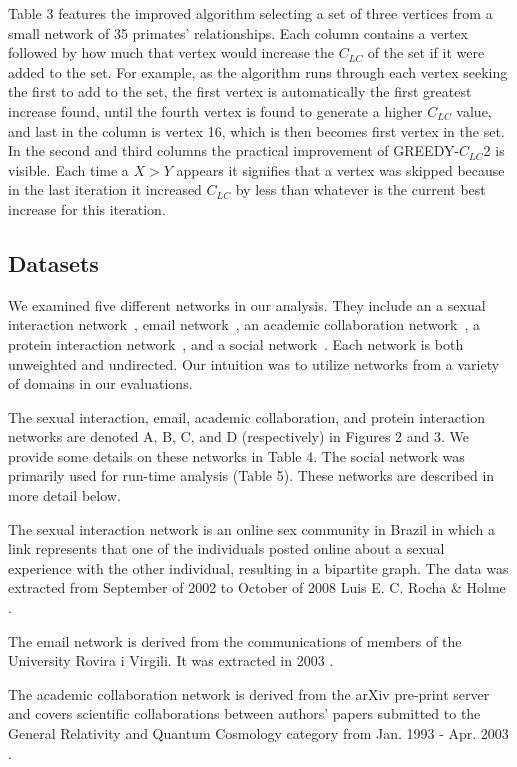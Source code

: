 \begin{Example}
Table 3 features the improved algorithm selecting a set of three vertices from a small network of 35 primates' relationships.  Each column contains a vertex followed by how much that vertex would increase the $C_{LC}$ of the set if it were added to the set.  For example, as the algorithm runs through each vertex seeking the first to add to the set, the first vertex is automatically the first greatest increase found, until the fourth vertex is found to generate a higher $C_{LC}$ value, and last in the column is vertex 16, which is then becomes first vertex in the set.  In the second and third columns the practical improvement of GREEDY-$C_{LC}$2 is visible. Each time a $X > Y$ appears it signifies that a vertex was skipped because in the last iteration it increased $C_{LC}$ by less than whatever is the current best increase for this iteration.
\end{Example}

\subsection{Datasets}
We examined five different networks in our analysis. They include an  a sexual interaction network~\cite{rocha10}, email network~\cite{arenas}, an academic collaboration network~\cite{snap12}, a protein interaction network~\cite{ccnr}, and a social network~\cite{abc}.  Each network is both unweighted and undirected.  Our intuition was to utilize networks from a variety of domains in our evaluations.

The sexual interaction, email, academic collaboration, and protein interaction networks are denoted A, B, C, and D (respectively) in Figures 2 and 3.  We provide some details on these networks in Table 4.  The social network was primarily used for run-time analysis (Table 5).   These networks are described in more detail below.

The sexual interaction network is an online sex community in Brazil in which a link represents that one of the individuals posted online about a sexual experience with the other individual, resulting in a bipartite graph. The data was extracted from September of 2002 to October of 2008 Luis E. C. Rocha \& Holme \cite{rocha10}.

The email network is derived from the communications of members of the University Rovira i Virgili. It was extracted in 2003 \cite{arenas}.

The academic collaboration network is derived from the arXiv pre-print server and covers scientific collaborations between authors’ papers submitted to the General Relativity and Quantum Cosmology category from Jan. 1993 - Apr. 2003 \cite{snap12}.

